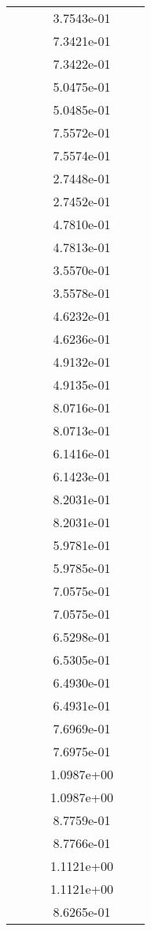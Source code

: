 \begin{xltabular}{\textwidth}{r|rS[table-format=1.3e+2]S[table-format=1.4e+2]S[table-format=1.4e+2]S[table-format=-1.5]}
&  &  & 3.7543e-01 & & \\
&  &  & 7.3421e-01 & & \\
&  &  & 7.3422e-01 & & \\
&  &  & 5.0475e-01 & & \\
&  &  & 5.0485e-01 & & \\
&  &  & 7.5572e-01 & & \\
&  &  & 7.5574e-01 & & \\
&  &  & 2.7448e-01 & & \\
&  &  & 2.7452e-01 & & \\
&  &  & 4.7810e-01 & & \\
&  &  & 4.7813e-01 & & \\
&  &  & 3.5570e-01 & & \\
&  &  & 3.5578e-01 & & \\
&  &  & 4.6232e-01 & & \\
&  &  & 4.6236e-01 & & \\
&  &  & 4.9132e-01 & & \\
&  &  & 4.9135e-01 & & \\
&  &  & 8.0716e-01 & & \\
&  &  & 8.0713e-01 & & \\
&  &  & 6.1416e-01 & & \\
&  &  & 6.1423e-01 & & \\
&  &  & 8.2031e-01 & & \\
&  &  & 8.2031e-01 & & \\
&  &  & 5.9781e-01 & & \\
&  &  & 5.9785e-01 & & \\
&  &  & 7.0575e-01 & & \\
&  &  & 7.0575e-01 & & \\
&  &  & 6.5298e-01 & & \\
&  &  & 6.5305e-01 & & \\
&  &  & 6.4930e-01 & & \\
&  &  & 6.4931e-01 & & \\
&  &  & 7.6969e-01 & & \\
&  &  & 7.6975e-01 & & \\
&  &  & 1.0987e+00 & & \\
&  &  & 1.0987e+00 & & \\
&  &  & 8.7759e-01 & & \\
&  &  & 8.7766e-01 & & \\
&  &  & 1.1121e+00 & & \\
&  &  & 1.1121e+00 & & \\
&  &  & 8.6265e-01 & & \\

\end{xltabular}
